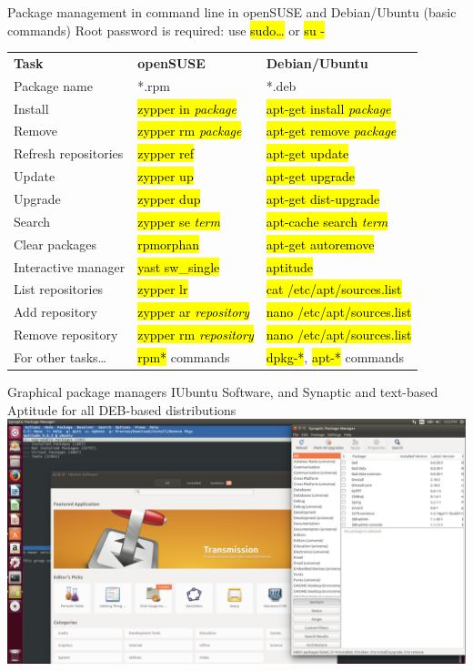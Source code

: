 \documentclass[compress, ucs, xelatex, 11pt, xcolor=svgnames,
  hyperref={
    bookmarks=true,
    unicode=true,
    colorlinks=true,
    pdftitle={Linux, command line and MetaCentrum},
    plainpages=false,
    pdfauthor={Vojtech Zeisek},
    pdfsubject={Course about use of Linux command line, writing shell scripts and using MetaCentrum of CESNET},
    pdfcreator={XeLaTeX},
    pdfkeywords={Linux, GNU, BASH, shell, command line, MetaCentrum},
    linkcolor=DarkRed,
    anchorcolor=DarkBlue,
    citecolor=Indigo,
    filecolor=NavyBlue,
    menucolor=DarkMagenta,
    urlcolor=DarkBlue,
    pdftex},
  url={hyphens, lowtilde} %
  ]{beamer}
\renewcommand{\texttt}[1]{\hl{\ttfamily #1}}
\begin{document}
\begin{frame}{Package management in command line in openSUSE and Debian/Ubuntu (basic commands)}
  Root password is required: use \texttt{sudo\ldots} or \texttt{su -}
  \begin{center}
    \begin{footnotesize}
      \begin{tabular}{lll}
	\textbf{Task} & \textbf{openSUSE} & \textbf{Debian/Ubuntu}\\
	Package name & *.rpm & *.deb\\
	Install & \texttt{zypper in \textit{package}} & \texttt{apt-get install \textit{package}}\\
	Remove & \texttt{zypper rm \textit{package}} & \texttt{apt-get remove \textit{package}}\\
	Refresh repositories & \texttt{zypper ref} & \texttt{apt-get update}\\
	Update & \texttt{zypper up} & \texttt{apt-get upgrade}\\
	Upgrade & \texttt{zypper dup} & \texttt{apt-get dist-upgrade}\\
	Search & \texttt{zypper se \textit{term}} & \texttt{apt-cache search \textit{term}}\\
	Clear packages & \texttt{rpmorphan} & \texttt{apt-get autoremove}\\
	Interactive manager & \texttt{yast sw\_single} & \texttt{aptitude}\\
	List repositories & \texttt{zypper lr} & \texttt{cat /etc/apt/sources.list}\\
	Add repository & \texttt{zypper ar \textit{repository}} & \texttt{nano /etc/apt/sources.list}\\
	Remove repository & \texttt{zypper rm \textit{repository}} & \texttt{nano /etc/apt/sources.list}\\
	For other tasks\ldots & \texttt{rpm*} commands & \texttt{dpkg-*}, \texttt{apt-*} commands
      \end{tabular}
    \end{footnotesize}
  \end{center}
\end{frame}

\begin{frame}{Graphical package managers I}{Ubuntu Software, and Synaptic and text-based Aptitude for all DEB-based distributions}
  \includegraphics[width=\textwidth]{software_managers_ubuntu_deb.png}
\end{frame}
\end{document}
